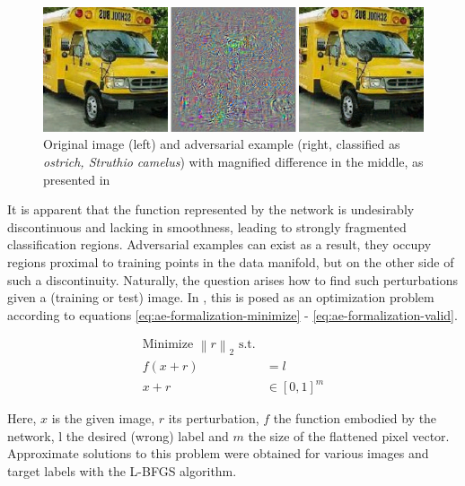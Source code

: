 \documentclass[11pt, a4paper]{article}
\newcommand\brackets[1]{\left[#1\right]}
\renewcommand{\vec}[1]{\underline{#1}}
\newcommand{\mat}[1]{\underline{\underline{#1}}}
\newcommand{\norm}[1]{\left\lVert#1\right\rVert}
\begin{document}
\begin{figure}[htb]
\centering
	\includegraphics[width=\textwidth]{images/intruiging_properties_ae.png}
	\caption{Original image (left) and adversarial example (right, classified as \emph{ostrich, Struthio
camelus}) with magnified difference in the middle, as presented in \cite{intriguing-properties-of-neural-networks}}
	\label{fig:intriguing-properties-ae}
\end{figure}

It is apparent that the function represented by the network is undesirably discontinuous and lacking in smoothness, leading to strongly fragmented classification regions. Adversarial examples can exist as a result, they occupy regions proximal to training points in the data manifold, but on the other side of such a discontinuity. Naturally, the question arises how to find such perturbations given a (training or test) image. In \cite{intriguing-properties-of-neural-networks}, this is posed as an optimization problem according to equations \eqref{eq:ae-formalization-minimize} - \eqref{eq:ae-formalization-valid}.

\begin{align}
	\text{Minimize $\norm{r}_2$ s.t.} \label{eq:ae-formalization-minimize} \\
	f(x + r) &= l \label{eq:ae-formalization-label} \\
	x + r &\in \brackets{0, 1}^m \label{eq:ae-formalization-valid}
\end{align}

Here, $x$ is the given image, $r$ its perturbation, $f$ the function embodied by the network, l the desired (wrong) label and $m$ the size of the flattened pixel vector. Approximate solutions to this problem were obtained for various images and target labels with the L-BFGS algorithm.
\end{document}
